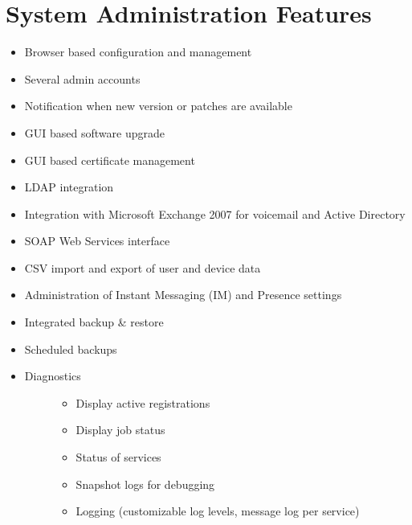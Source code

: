 \documentclass[letterpaper,10pt,english]{sphinxmanual}
\begin{document}
\section{System Administration Features}
\label{\detokenize{features:system-administration-features}}\begin{itemize}
\item {} 
Browser based configuration and management

\item {} 
Several admin accounts

\item {} 
Notification when new version or patches are available

\item {} 
GUI based software upgrade

\item {} 
GUI based certificate management

\item {} 
LDAP integration

\item {} 
Integration with Microsoft Exchange 2007 for voicemail and Active Directory

\item {} 
SOAP Web Services interface

\item {} 
CSV import and export of user and device data

\item {} 
Administration of Instant Messaging (IM) and Presence settings

\item {} 
Integrated backup \& restore

\item {} 
Scheduled backups

\item {} \begin{description}
\item[{Diagnostics}] \leavevmode\begin{itemize}
\item {} 
Display active registrations

\item {} 
Display job status

\item {} 
Status of services

\item {} 
Snapshot logs for debugging

\item {} 
Logging (customizable log levels, message log per service)


\end{itemize}
\end{description}
\end{itemize}
\end{document}
